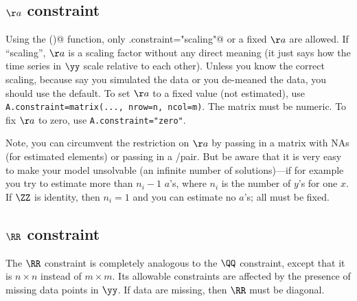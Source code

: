 \subsection{$\aa$ constraint}

Using the \verb@MARSS()@ function, only \verb@A.constraint="scaling"@ or a fixed $\aa$ are allowed.  If ``scaling'', $\aa$ is a scaling factor without any direct meaning (it just says how the time series in $\yy$ scale relative to each other).   Unless you know the correct scaling, because say you simulated the data or you de-meaned the data, you should use the default.   To set $\aa$ to a fixed value (not estimated), use \texttt{A.constraint=matrix(..., nrow=n, ncol=m)}. The matrix must be numeric.  To fix $\aa$ to zero, use \texttt{A.constraint="zero"}.  

Note, you can circumvent the restriction on $\aa$ by passing in a matrix with NAs (for estimated elements) or passing in a \verb@fixed@/\verb@free@ pair.  But be aware that it is very easy to make your model unsolvable (an infinite number of solutions)---if for example you try to estimate more than $n_i-1$ $a$'s, where $n_i$ is the number of $y$'s for one $x$.  If $\ZZ$ is identity, then $n_i=1$ and you can estimate no $a$'s; all must be fixed. 

\subsection{$\RR$ constraint}

The $\RR$ constraint is completely analogous to the $\QQ$ constraint, except that it is $n \times n$ instead of $m \times m$.  Its allowable constraints are affected by the presence of missing data points in $\yy$.  If data are missing, then $\RR$ must be diagonal.
